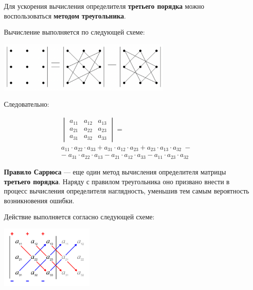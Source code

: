 \documentclass[a4paper,12pt,oneside]{extbook}
\theoremstyle{numbered}
\theoremstyle{unnumbered}
\theoremstyle{named}
\theoremstyle{unnumbered}
\theoremstyle{named}
\theoremstyle{named}
\theoremstyle{named}
\begin{document}
Для ускорения вычисления определителя \textbf{третьего порядка} можно воспользоваться \textbf{методом треугольника}.

Вычисление выполняется по следующей схеме:

\begin{center}
    \includegraphics[width=0.65\textwidth]{triangle_rule.png}
\end{center}

Следовательно:

\begin{gather*}
    \begin{vmatrix}
        a_{11} & a_{12} & a_{13} \\
        a_{21} & a_{22} & a_{23} \\
        a_{31} & a_{32} & a_{33}
    \end{vmatrix}
    =                                                                                                      \\
    a_{11} \cdot a_{22} \cdot a_{33} + a_{31} \cdot a_{12} \cdot a_{23} + a_{23} \cdot a_{13} \cdot a_{32} \; - \\
    - \; a_{31} \cdot a_{22} \cdot a_{13} - a_{21} \cdot a_{12} \cdot a_{33} - a_{11} \cdot a_{23} \cdot a_{32}
\end{gather*}

\textbf{Правило Саррюса} — еще один метод вычисления определителя матрицы \textbf{третьего порядка}.
Наряду с правилом треугольника оно призвано внести в процесс вычисления определителя наглядность, уменьшив тем самым вероятность возникновения ошибки.

Действие выполняется согласно следующей схеме:

\begin{center}
    \includegraphics[width=0.35\textwidth]{sarrus_rule.png}
\end{center}
\end{document}
